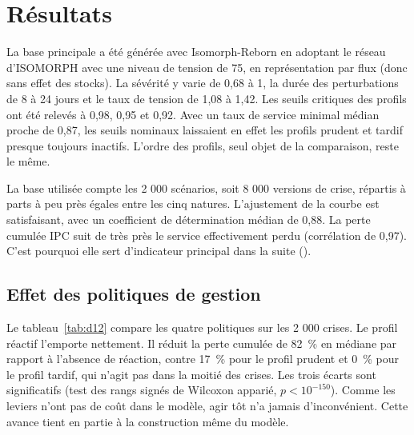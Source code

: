 \section{Résultats}
\label{sec:4}

\label{sec:4.1}

La base principale a été générée avec Isomorph-Reborn en adoptant le réseau d'ISOMORPH avec une niveau de tension de 75, en représentation par flux (donc sans effet des stocks). La sévérité y varie de 0,68 à 1, la durée des perturbations de 8 à 24 jours et le taux de tension de 1,08 à 1,42. Les seuils critiques des profils ont été relevés à 0,98, 0,95 et 0,92. Avec un taux de service minimal médian proche de 0,87, les seuils nominaux laissaient en effet les profils prudent et tardif presque toujours inactifs. L'ordre des profils, seul objet de la comparaison, reste le même.

La base utilisée compte les 2 000 scénarios, soit 8 000 versions de crise, répartis à parts à peu près égales entre les cinq natures. L'ajustement de la courbe est satisfaisant, avec un coefficient de détermination médian de 0,88. La perte cumulée IPC suit de très près le service effectivement perdu (corrélation de 0,97). C'est pourquoi elle sert d'indicateur principal dans la suite ().

\subsection{Effet des politiques de gestion}
\label{sec:4.2}

Le tableau~\ref{tab:d12} compare les quatre politiques sur les 2 000 crises. Le profil réactif l'emporte nettement. Il réduit la perte cumulée de 82~\% en médiane par rapport à l'absence de réaction, contre 17~\% pour le profil prudent et 0~\% pour le profil tardif, qui n'agit pas dans la moitié des crises. Les trois écarts sont significatifs (test des rangs signés de Wilcoxon apparié, $p < 10^{-150}$). Comme les leviers n'ont pas de coût dans le modèle, agir tôt n'a jamais d'inconvénient. Cette avance tient en partie à la construction même du modèle.


